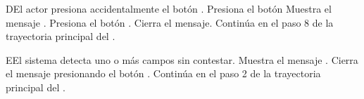 \begin{UCtrayectoriaA}{D}{El actor presiona accidentalmente el botón .}
	\UCpaso[\UCactor] Presiona el botón 
	\UCpaso Muestra el mensaje .
	\UCpaso[\UCactor] Presiona el botón .
	\UCpaso Cierra el mensaje.
	\UCpaso Continúa en el paso 8 de la trayectoria principal del .
\end{UCtrayectoriaA}

\begin{UCtrayectoriaA}{E}{El sistema detecta uno o más campos sin contestar.}
	\UCpaso Muestra el mensaje .
	\UCpaso[\UCactor] Cierra el mensaje presionando el botón .
	\UCpaso Continúa en el paso 2 de la trayectoria principal del .
\end{UCtrayectoriaA}
